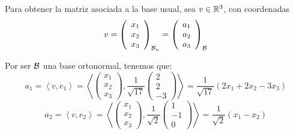 \begin{ejercicio}
\begin{enumerate}
        Para obtener la matriz asociada a la base usual, sea $v\in \mathbb{R}^3$, con coordenadas
        \begin{equation*}
            v=\left(\begin{array}{c}
                     x_1 \\ x_2 \\ x_3
                \end{array}\right)_{\mathcal{B}_u}
                =\left(\begin{array}{c}
                     a_1 \\ a_2 \\ a_3
                \end{array}\right)_{\mathcal{B}}
        \end{equation*}

        Por ser $\mathcal{B}$ una base ortonormal, tenemos que:
        \begin{equation*}
            a_1 = \left\langle 
                v, e_1\right\rangle
                = \left\langle 
                \left(\begin{array}{c}
                     x_1 \\ x_2 \\ x_3
                \end{array}\right),
                \frac{1}{\sqrt{17}}\left(\begin{array}{c}
                     2 \\ 2 \\ -3
                \end{array}\right)
                \right\rangle
                = \frac{1}{\sqrt{17}}(2x_1+2x_2-3x_3)
        \end{equation*}
        \begin{equation*}
            a_2 = \left\langle 
                v, e_2\right\rangle
                = \left\langle 
                \left(\begin{array}{c}
                     x_1 \\ x_2 \\ x_3
                \end{array}\right),
                \frac{1}{\sqrt{2}}
                \left(\begin{array}{c}
                     1 \\ -1 \\ 0
                \end{array}\right)
                \right\rangle
                = \frac{1}{\sqrt{2}}(x_1-x_2)
        \end{equation*}

\end{enumerate}
\end{ejercicio}
